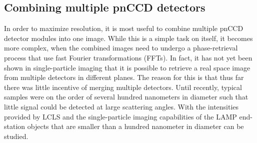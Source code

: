%
%
%
%
%
%
\subsection{Combining multiple pnCCD detectors}\label{sec:combination-of-images}
In order to maximize resolution, it is most useful to combine multiple pnCCD detector modules into one image. While this is a simple task on itself, it becomes more complex, when the combined images need to undergo a phase-retrieval process that use fast Fourier transformations (FFTs). In fact, it has not yet been shown in single-particle imaging that it is possible to retrieve a real space image from multiple detectors in different planes.
The reason for this is that thus far there was little incentive of merging multiple detectors. Until recently, typical samples were on the order of several hundred nanometers in diameter such that little signal could be detected at large scattering angles. With the intensities provided by LCLS and the single-particle imaging capabilities of the LAMP end-station objects that are smaller than a hundred nanometer in diameter can be studied.
